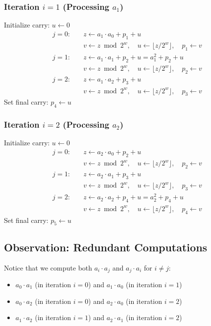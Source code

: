\documentclass{article}
\begin{document}
\subsubsection{Iteration $i = 1$ (Processing $a_1$)}
Initialize carry: $u \leftarrow 0$
\begin{align*}
j = 0: \quad & z \leftarrow a_1 \cdot a_0 + p_1 + u \\
& v \leftarrow z \bmod 2^w, \quad u \leftarrow \lfloor z/2^w \rfloor, \quad p_1 \leftarrow v \\[0.5em]
j = 1: \quad & z \leftarrow a_1 \cdot a_1 + p_2 + u = a_1^2 + p_2 + u \\
& v \leftarrow z \bmod 2^w, \quad u \leftarrow \lfloor z/2^w \rfloor, \quad p_2 \leftarrow v \\[0.5em]
j = 2: \quad & z \leftarrow a_1 \cdot a_2 + p_3 + u \\
& v \leftarrow z \bmod 2^w, \quad u \leftarrow \lfloor z/2^w \rfloor, \quad p_3 \leftarrow v
\end{align*}
Set final carry: $p_4 \leftarrow u$

\subsubsection{Iteration $i = 2$ (Processing $a_2$)}
Initialize carry: $u \leftarrow 0$
\begin{align*}
j = 0: \quad & z \leftarrow a_2 \cdot a_0 + p_2 + u \\
& v \leftarrow z \bmod 2^w, \quad u \leftarrow \lfloor z/2^w \rfloor, \quad p_2 \leftarrow v \\[0.5em]
j = 1: \quad & z \leftarrow a_2 \cdot a_1 + p_3 + u \\
& v \leftarrow z \bmod 2^w, \quad u \leftarrow \lfloor z/2^w \rfloor, \quad p_3 \leftarrow v \\[0.5em]
j = 2: \quad & z \leftarrow a_2 \cdot a_2 + p_4 + u = a_2^2 + p_4 + u \\
& v \leftarrow z \bmod 2^w, \quad u \leftarrow \lfloor z/2^w \rfloor, \quad p_4 \leftarrow v
\end{align*}
Set final carry: $p_5 \leftarrow u$

\subsection{Observation: Redundant Computations}
Notice that we compute both $a_i \cdot a_j$ and $a_j \cdot a_i$ for $i \neq j$:
\begin{itemize}
    \item $a_0 \cdot a_1$ (in iteration $i=0$) and $a_1 \cdot a_0$ (in iteration $i=1$)
    \item $a_0 \cdot a_2$ (in iteration $i=0$) and $a_2 \cdot a_0$ (in iteration $i=2$)
    \item $a_1 \cdot a_2$ (in iteration $i=1$) and $a_2 \cdot a_1$ (in iteration $i=2$)
\end{itemize}
\end{document}
